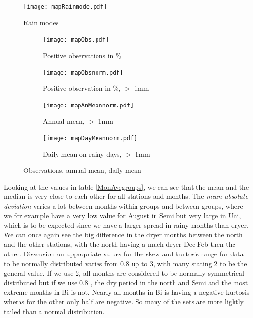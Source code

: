 \documentclass{article}
\begin{document}
		\begin{figure}
			\centering
			\texttt{[image: mapRainmode.pdf]}
			\caption{Rain modes}
			\label{mapRainmode}
		\end{figure}
		\begin{figure}[H]
		\centering
		\begin{subfigure}{0.4\linewidth}
			\centering
			\texttt{[image: mapObs.pdf]}
			\caption{Positive observations in \%}
		\end{subfigure}%
		\begin{subfigure}{0.4\linewidth}
			\centering
			\texttt{[image: mapObsnorm.pdf]}
			\caption{Positive observation in \%, $>$ 1mm}
		\end{subfigure}
		\begin{subfigure}{0.4\linewidth}
			\centering
			\texttt{[image: mapAnMeannorm.pdf]}
			\caption{Annual mean, $>$ 1mm}
		\end{subfigure}%
		\begin{subfigure}{0.4\linewidth}
			\centering
			\texttt{[image: mapDayMeannorm.pdf]}
			\caption{Daily mean on rainy days, $>$ 1mm}
		\end{subfigure}
		\caption{Observations, annual mean, daily mean}
		\label{maps}
	\end{figure}
	Looking at the values in table \ref{MonAvegroups}, we can see that the mean and the median is very close to each other for all stations and months. The \textit{mean absolute deviation} varies a lot between months within groups and between groups, where we for example have a very low value for August in Semi but very large in Uni, which is to be expected since we have a larger spread in rainy months than dryer. We can once again see the big difference in the dryer months between the north and the other stations, with the north having a much dryer Dec-Feb then the other. Disscusion on appropriate values for the skew and kurtosis range for data to be normally distributed varies from 0.8 up to 3, with many stating 2 to be the general value. If we use 2, all months are considered to be normally symmetrical distributed but if we use 0.8 , the dry period in the north and Semi and the most extreme months in Bi is not. Nearly all months in Bi is having a negative kurtosis wheras for the other only half are negative. So many of the sets are more lightly tailed than a normal distribution.\\
	
\end{document}
